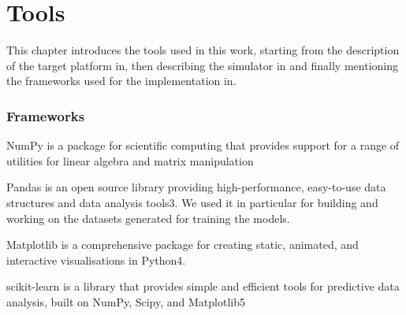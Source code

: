 \chapter{Tools}
\label{chap:impl}

This chapter introduces the tools used in this work, starting from the description of the target platform in, then describing the simulator in and finally mentioning the frameworks used for the implementation in.

\subsection{Frameworks}
\label{subsec:Frameworks}

NumPy is a package for scientific computing that provides support for a range of utilities for linear algebra and matrix manipulation

Pandas is an open source library providing high-performance, easy-to-use data structures and data analysis tools3. We used it in particular for building and working on the datasets generated for training the models.

Matplotlib is a comprehensive package for creating static, animated, and interactive visualisations in Python4.

scikit-learn is a library that provides simple and efficient tools for predictive data analysis, built on NumPy, Scipy, and Matplotlib5